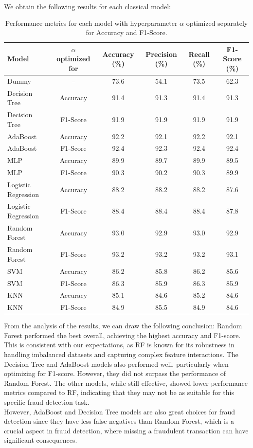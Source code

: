 \documentclass[10pt]{article}
\begin{document}
We obtain the following results for each classical model:
\begin{table}[H]
	\centering
	\begin{tabular}{|l|c|c|c|c|c|}
		\hline
		\textbf{Model} & \textbf{$\alpha$ optimized for} & \textbf{Accuracy (\%)} & \textbf{Precision (\%)} & \textbf{Recall (\%)} & \textbf{F1-Score (\%)} \\
		\hline
		Dummy & – & 73.6 & 54.1 & 73.5 & 62.3 \\
		\hline
		Decision Tree & Accuracy & 91.4 & 91.3 & 91.4 & 91.3 \\
		Decision Tree & F1-Score & 91.9 & 91.9 & 91.9 & 91.9 \\
		\hline
		AdaBoost & Accuracy & 92.2 & 92.1 & 92.2 & 92.1 \\
		AdaBoost & F1-Score & 92.4 & 92.3 & 92.4 & 92.4 \\
		\hline
		MLP & Accuracy & 89.9 & 89.7 & 89.9 & 89.5 \\
		MLP & F1-Score & 90.3 & 90.2 & 90.3 & 89.9 \\
		\hline
		Logistic Regression & Accuracy & 88.2 & 88.2 & 88.2 & 87.6 \\
		Logistic Regression & F1-Score & 88.4 & 88.4 & 88.4 & 87.8 \\
		\hline
		Random Forest & Accuracy & 93.0 & 92.9 & 93.0 & 92.9 \\
		Random Forest & F1-Score & 93.2 & 93.2 & 93.2 & 93.1 \\
		\hline
		SVM & Accuracy & 86.2 & 85.8 & 86.2 & 85.6 \\
		SVM & F1-Score & 86.3 & 85.9 & 86.3 & 85.9 \\
		\hline
		KNN & Accuracy & 85.1 & 84.6 & 85.2 & 84.6 \\
		KNN & F1-Score & 84.9 & 85.5 & 84.9 & 84.6 \\
		\hline
	\end{tabular}
	\caption{Performance metrics for each model with hyperparameter $\alpha$ optimized separately for Accuracy and F1-Score.}
\end{table}
\noindent From the analysis of the results, we can draw the following conclusion: Random Forest performed the best overall, achieving the highest accuracy and F1-score. This is consistent with our expectations, as RF is known for its robustness in handling imbalanced datasets and capturing complex feature interactions. The Decision Tree and AdaBoost models also performed well, particularly when optimizing for F1-score. However, they did not surpass the performance of Random Forest. The other models, while still effective, showed lower performance metrics compared to RF, indicating that they may not be as suitable for this specific fraud detection task.\\
However, AdaBoost and Decision Tree models are also great choices for fraud detection since they have less false-negatives than Random Forest, which is a crucial aspect in fraud detection, where missing a fraudulent transaction can have significant consequences.\\
\end{document}
